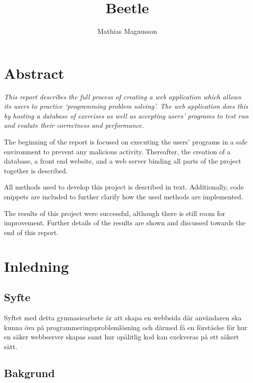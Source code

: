 \documentclass{article}
\author{Mathias Magnusson}
\title{Beetle}
\date{}
\begin{document}
\maketitle{}

\section*{Abstract}

\begin{par}

\itshape
This report describes the full process of creating a web application which
allows its users to practice `programming problem solving'. The web application
does this by hosting a database of exercises as well as accepting users'
programs to test run and evalute their correctness and performance.

The beginning of the report is focused on executing the users' programs in a
safe environment to prevent any malicious activity. Thereafter, the creation of
a database, a front end website, and a web server binding all parts of the
project together is described.

All methods used to develop this project is described in text. Additionally,
code snippets are included to further clarify how the used methods are
implemented.

The results of this project were successful, although there is still room for
improvement. Further details of the results are shown and discussed towards the
end of this report.

\end{par}

\clearpage

\tableofcontents

\clearpage

\section{Inledning}

\subsection{Syfte}

Syftet med detta gymnasiearbete är att skapa en webbsida där användaren ska
kunna öva på programmeringsproblemlösning och därmed få en förståelse för hur
en säker webbserver skapas samt hur opålitlig kod kan exekveras på ett säkert
sätt.

\subsection{Bakgrund}
\end{document}
